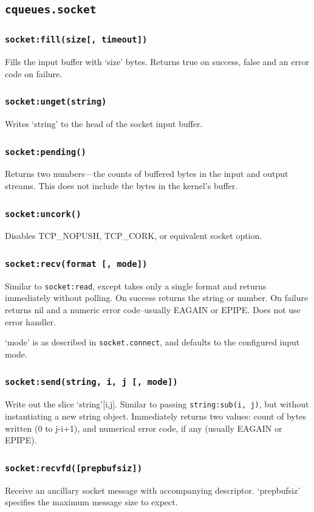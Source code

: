 \documentclass[11pt, oneside]{memoir}
\newcommand*{\fn}[1]{\texttt{#1}\xspace}
\newcommand*{\method}[1]{\texttt{#1}\xspace}
\newcounter{toccols}
\newenvironment{Module}[1]{
	\subsection{\texttt{#1}}
	\addtocontents{toc}{
		\protect\begin{multicols}{\value{toccols}}
	}
}{
	\addtocontents{toc}{\protect\end{multicols}}
}
\begin{document}
\begin{Module}{cqueues.socket}
\subsubsection[\fn{socket:fill}]{\fn{socket:fill(size[, timeout])}}
Fills the input buffer with `size' bytes. Returns true on success, false and an error code on failure.

\subsubsection[{\fn{socket:unget}}]{\fn{socket:unget(string)}}
Writes `string' to the head of the socket input buffer.

\subsubsection[{\fn{socket:pending}}]{\fn{socket:pending()}}
Returns two numbers---the counts of buffered bytes in the input and output streams. This does not include the bytes in the kernel's buffer.

\subsubsection[\fn{socket:uncork}]{\fn{socket:uncork()}}
Disables TCP\_NOPUSH, TCP\_CORK, or equivalent socket option.

\subsubsection[\fn{socket:recv}]{\fn{socket:recv(format [, mode])}}
Similar to \method{socket:read}, except takes only a single format and returns immediately without polling. On success returns the string or number. On failure returns nil and a numeric error code--usually EAGAIN or EPIPE. Does not use error handler.

`mode' is as described in \fn{socket.connect}, and defaults to the configured input mode.

\subsubsection[\fn{socket:send}]{\fn{socket:send(string, i, j [, mode])}}
Write out the slice `string'[i,j]. Similar to passing \fn{string:sub(i, j)}, but without instantiating a new string object. Immediately returns two values: count of bytes written (0 to j-i+1), and numerical error code, if any (usually EAGAIN or EPIPE).

\subsubsection[\fn{socket:recvfd}]{\fn{socket:recvfd([prepbufsiz])}}
Receive an ancillary socket message with accompanying descriptor. `prepbufsiz' specifies the maximum message size to expect.


\end{Module}
\end{document}
